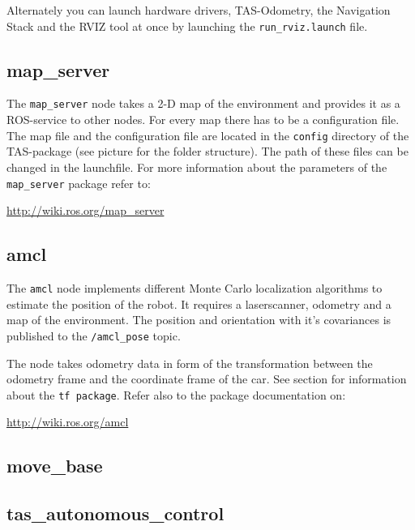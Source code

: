 Alternately you can launch hardware drivers, TAS-Odometry, the Navigation Stack and the RVIZ tool at once by launching the \texttt{run\_rviz.launch} file.

\subsection{map\_server}
\label{sec:tas_package_map_server}
The \texttt{map\_server} node takes a 2-D map of the environment and provides it as a ROS-service to other nodes. For every map there has to be a configuration file. The map file and the configuration file are located in the \texttt{config} directory of the TAS-package (see picture  for the folder structure). The path of these files can be changed in the launchfile. For more information about the parameters of the \texttt{map\_server} package refer to:

\hyperref[http://wiki.ros.org/map_server]{http://wiki.ros.org/map_server}


\subsection{amcl}
\label{sec:tas_package_amcl}
The \texttt{amcl} node implements different Monte Carlo localization algorithms to estimate the position of the robot. It requires a laserscanner, odometry and a map of the environment. The position and orientation with it's covariances is published to the \texttt{/amcl\_pose} topic.

The node takes odometry data in form of the transformation between the odometry frame and the coordinate frame of the car. See section  for information about the \texttt{tf package}. Refer also to the package documentation on:

\hyperref[http://wiki.ros.org/amcl]{http://wiki.ros.org/amcl}



\subsection{move\_base}
\label{sec:tas_package_move_base}

\subsection{tas\_autonomous\_control}
\label{sec:tas_package_autonomous_control}












